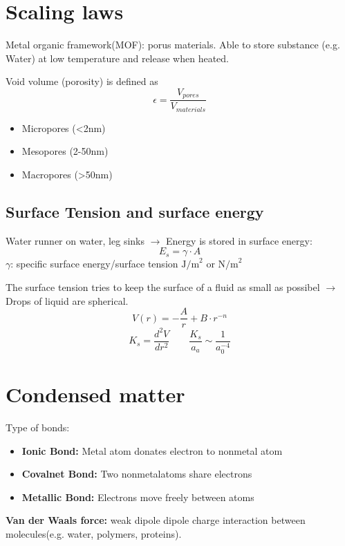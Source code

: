 \section{Scaling laws}


Metal organic framework(MOF): porus materials. Able to store substance (e.g. Water) at low temperature and release when heated.

Void volume (porosity) is defined as
\[
\epsilon = \frac{V_{pores}}{V_{materials}}
\]
\begin{itemize}
    \item Micropores (<2nm)
    \item Mesopores (2-50nm)
    \item Macropores (>50nm)
\end{itemize}
\subsection{Surface Tension and surface energy}
Water runner on water, leg sinks \(\rightarrow\) Energy is stored in surface energy:
\[
E_s = \gamma \cdot A
\]
\(\gamma\): specific surface energy/surface tension \(\text{J/m}^2\) or \(\text{N/m}^2\) 

The surface tension tries to keep the surface of a fluid as small as possibel \(\rightarrow\) Drops of liquid are spherical.
\[
V(r) = -\frac{A}{r} +B \cdot r^{-n}
\]
\[
K_s = \frac{d^2V}{dr^2} \qquad \frac{K_s}{a_a} \sim \frac{1}{a_0^{-4}}
\]%
\section{Condensed matter}
Type of bonds:
\begin{itemize}
    \item \textbf{Ionic Bond:} Metal atom donates electron to nonmetal atom
    \item \textbf{Covalnet Bond:} Two nonmetalatoms share electrons
    \item \textbf{Metallic Bond:} Electrons move freely between atoms
\end{itemize}
\textbf{Van der Waals force:} weak dipole dipole charge interaction between molecules(e.g. water, polymers, proteins).


